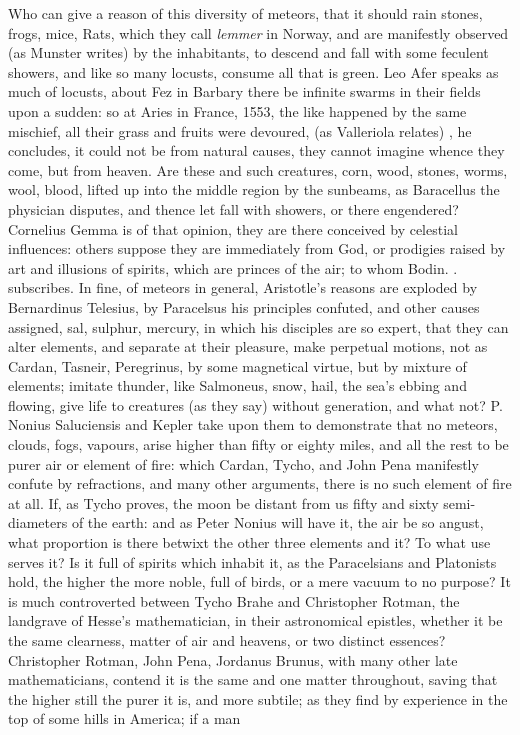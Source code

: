 {Who can give a reason of this diversity of meteors, that it should rain stones, frogs, mice, \etc{} Rats, which they call \emph{lemmer} in Norway, and are manifestly observed (as Munster writes) by the inhabitants, to descend and fall with some feculent showers, and like so many locusts, consume all that is green. Leo Afer speaks as much of locusts, about Fez in Barbary there be infinite swarms in their fields upon a sudden: so at Aries in France, 1553, the like happened by the same mischief, all their grass and fruits were devoured,  (as Valleriola  relates) , \etc{} he concludes, it could not be from natural causes, they cannot imagine whence they come, but from heaven. Are these and such creatures, corn, wood, stones, worms, wool, blood, \etc{} lifted up into the middle region by the sunbeams, as Baracellus the physician disputes, and thence let fall with showers, or there engendered? Cornelius Gemma is of that opinion, they are there conceived by celestial influences: others suppose they are immediately from God, or prodigies raised by art and illusions of spirits, which are princes of the air; to whom Bodin. . subscribes. In fine, of meteors in general, Aristotle's reasons are exploded by Bernardinus Telesius, by Paracelsus his principles confuted, and other causes assigned, sal, sulphur, mercury, in which his disciples are so expert, that they can alter elements, and separate at their pleasure, make perpetual motions, not as Cardan, Tasneir, Peregrinus, by some magnetical virtue, but by mixture of elements; imitate thunder, like Salmoneus, snow, hail, the sea's ebbing and flowing, give life to creatures (as they say) without generation, and what not? P. Nonius Saluciensis and Kepler take upon them to demonstrate that no meteors, clouds, fogs, vapours, arise higher than fifty or eighty miles, and all the rest to be purer air or element of fire: which Cardan, Tycho, and John Pena manifestly confute by refractions, and many other arguments, there is no such element of fire at all. If, as Tycho proves, the moon be distant from us fifty and sixty semi-diameters of the earth: and as Peter Nonius will have it, the air be so angust, what proportion is there betwixt the other three elements and it? To what use serves it? Is it full of spirits which inhabit it, as the Paracelsians and Platonists hold, the higher the more noble, full of birds, or a mere vacuum to no purpose? It is much controverted between Tycho Brahe and Christopher Rotman, the landgrave of Hesse's mathematician, in their astronomical epistles, whether it be the same  clearness, matter of air and heavens, or two distinct essences? Christopher Rotman, John Pena, Jordanus Brunus, with many other late mathematicians, contend it is the same and one matter throughout, saving that the higher still the purer it is, and more subtile; as they find by experience in the top of some hills in America; if a man }
